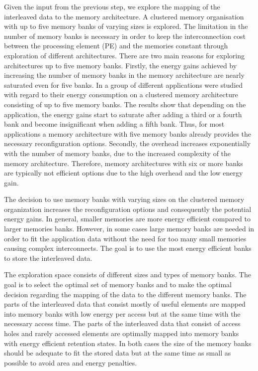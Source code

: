 \documentclass[prodmode,acmtecs]{acmsmall}
\begin{document}
Given the input from the previous step, we explore the mapping of the interleaved data to the memory architecture.
A clustered memory organisation with up to five memory banks of varying sizes is explored. 
The limitation in the number of memory banks is necessary in order to keep the interconnection cost between the processing element (PE) and the memories constant through exploration of different architectures. 
There are two main reasons for exploring architectures up to five memory banks.
Firstly, the energy gains achieved by increasing the number of memory banks in the memory architecture are nearly saturated even for five banks.
In \cite{filippopoulos2013exploration} a group of different applications were studied with regard to their energy consumption on a clustered memory architecture consisting of up to five memory banks.
The results show that depending on the application, the energy gains start to saturate after adding a third or a fourth bank and become insignificant when adding a fifth bank.
Thus, for most applications a memory architecture with five memory banks already provides the necessary reconfiguration options.  
Secondly, the overhead increases exponentially with the number of memory banks, due to the increased complexity of the memory architecture. 
Therefore, memory architectures with six or more banks are typically not efficient options due to the high overhead and the low energy gain.

The decision to use memory banks with varying sizes on the clustered memory organization increases the reconfiguration options and consequently the potential energy gains. 
In general, smaller memories are more energy efficient compared to larger memories banks. 
However, in some cases large memory banks are needed in order to fit the application data without the need for too many small memories causing complex interconnects. 
The goal is to use the most energy efficient banks to store the interleaved data.

The exploration space consists of different sizes and types of memory banks.
The goal is to select the optimal set of memory banks and to make  the optimal decision regarding the mapping of the data to the different memory banks.
The parts of the interleaved data that consist mostly of useful elements are mapped into memory banks with low energy per access but at the same time with the necessary access time.
The parts of the interleaved data that consist of access holes and rarely accessed elements are optimally mapped into memory banks with energy efficient retention states.
In both cases the size of  the memory banks should be adequate to fit the stored data but at the same time as small as possible to avoid area and energy penalties.
\end{document}
